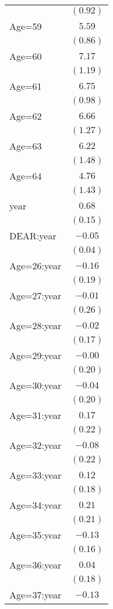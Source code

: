 \documentclass[fullpage]{paper}
\begin{document}
\begin{center}
\begin{longtable}{l c }
            & $(0.92)$ \\
Age=59      & $5.59$   \\
            & $(0.86)$ \\
Age=60      & $7.17$   \\
            & $(1.19)$ \\
Age=61      & $6.75$   \\
            & $(0.98)$ \\
Age=62      & $6.66$   \\
            & $(1.27)$ \\
Age=63      & $6.22$   \\
            & $(1.48)$ \\
Age=64      & $4.76$   \\
            & $(1.43)$ \\
year        & $0.68$   \\
            & $(0.15)$ \\
DEAR:year   & $-0.05$  \\
            & $(0.04)$ \\
Age=26:year & $-0.16$  \\
            & $(0.19)$ \\
Age=27:year & $-0.01$  \\
            & $(0.26)$ \\
Age=28:year & $-0.02$  \\
            & $(0.17)$ \\
Age=29:year & $-0.00$  \\
            & $(0.20)$ \\
Age=30:year & $-0.04$  \\
            & $(0.20)$ \\
Age=31:year & $0.17$   \\
            & $(0.22)$ \\
Age=32:year & $-0.08$  \\
            & $(0.22)$ \\
Age=33:year & $0.12$   \\
            & $(0.18)$ \\
Age=34:year & $0.21$   \\
            & $(0.21)$ \\
Age=35:year & $-0.13$  \\
            & $(0.16)$ \\
Age=36:year & $0.04$   \\
            & $(0.18)$ \\
Age=37:year & $-0.13$  \\

\end{longtable}
\end{center}
\end{document}
